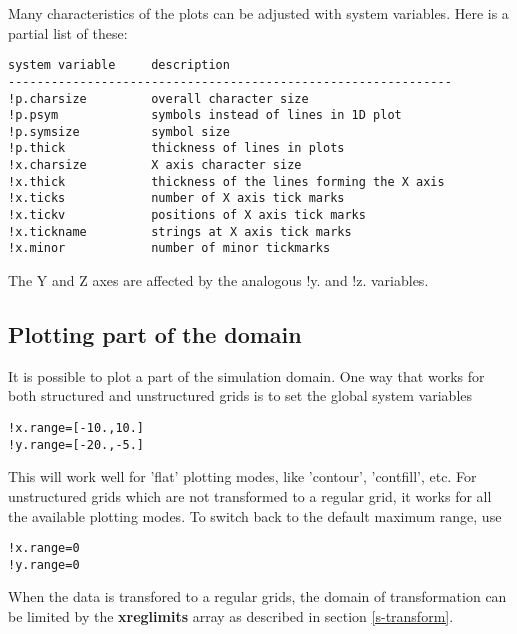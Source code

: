   Many characteristics of the plots can be adjusted with system variables.
   Here is a partial list of these:
\begin{verbatim}
system variable     description
--------------------------------------------------------------
!p.charsize         overall character size
!p.psym             symbols instead of lines in 1D plot
!p.symsize          symbol size
!p.thick            thickness of lines in plots
!x.charsize         X axis character size
!x.thick            thickness of the lines forming the X axis
!x.ticks            number of X axis tick marks
!x.tickv            positions of X axis tick marks
!x.tickname         strings at X axis tick marks
!x.minor            number of minor tickmarks
\end{verbatim}
  The Y and Z axes are affected by the analogous !y. and !z. variables.

\subsection{Plotting part of the domain \label{s-plot-part}}

   It is possible to plot a part of the simulation domain.
   One way that works for both structured and unstructured grids is
   to set the global system variables
\begin{verbatim}
!x.range=[-10.,10.]
!y.range=[-20.,-5.]
\end{verbatim}
   This will work well for 'flat' plotting modes, like 'contour',
   'contfill', etc. For unstructured grids which are not transformed
   to a regular grid, it works for all the available plotting modes.
   To switch back to the default maximum range, use
\begin{verbatim}
!x.range=0
!y.range=0
\end{verbatim}
   When the data is transfored to a regular grids, the domain of transformation
   can be limited by the {\bf xreglimits} array as described in section
   \ref{s-transform}. 

